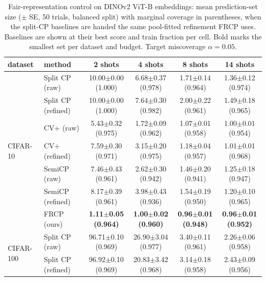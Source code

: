 \begin{table}[t]
\centering
\small
\setlength{\tabcolsep}{4pt}
\caption{Fair-representation control on DINOv2 ViT-B embeddings: mean prediction-set size ($\pm$ SE, 50 trials, balanced split) with marginal coverage in parentheses, when the split-CP baselines are handed the same pool-fitted refinement FRCP uses. Baselines are shown at their best score and train fraction per cell. Bold marks the smallest set per dataset and budget. Target miscoverage $\alpha=0.05$.}
\label{tab:refined-baselines-dinov2-a005}
\begin{tabular}{llcccc}
\toprule
dataset & method & 2 shots & 4 shots & 8 shots & 14 shots\\
\midrule
\multirow{7}{*}{CIFAR-10} & Split CP (raw) & 10.00$\pm$0.00 {\scriptsize(1.000)} & 6.68$\pm$0.37 {\scriptsize(0.978)} & 1.71$\pm$0.14 {\scriptsize(0.964)} & 1.36$\pm$0.12 {\scriptsize(0.974)}\\
 & Split CP (refined) & 10.00$\pm$0.00 {\scriptsize(1.000)} & 7.64$\pm$0.30 {\scriptsize(0.982)} & 2.00$\pm$0.22 {\scriptsize(0.961)} & 1.49$\pm$0.18 {\scriptsize(0.965)}\\
 & CV+ (raw) & 5.43$\pm$0.32 {\scriptsize(0.975)} & 1.72$\pm$0.09 {\scriptsize(0.962)} & 1.07$\pm$0.01 {\scriptsize(0.958)} & 1.00$\pm$0.01 {\scriptsize(0.954)}\\
 & CV+ (refined) & 7.59$\pm$0.30 {\scriptsize(0.971)} & 3.15$\pm$0.20 {\scriptsize(0.975)} & 1.18$\pm$0.04 {\scriptsize(0.957)} & 1.01$\pm$0.01 {\scriptsize(0.968)}\\
 & SemiCP (raw) & 7.46$\pm$0.43 {\scriptsize(0.961)} & 2.62$\pm$0.30 {\scriptsize(0.942)} & 1.46$\pm$0.20 {\scriptsize(0.941)} & 1.25$\pm$0.18 {\scriptsize(0.947)}\\
 & SemiCP (refined) & 8.17$\pm$0.39 {\scriptsize(0.961)} & 3.98$\pm$0.43 {\scriptsize(0.936)} & 1.54$\pm$0.19 {\scriptsize(0.950)} & 1.20$\pm$0.10 {\scriptsize(0.965)}\\
 & FRCP (ours) & \textbf{1.11$\pm$0.05 {\scriptsize(0.964)}} & \textbf{1.00$\pm$0.02 {\scriptsize(0.960)}} & \textbf{0.96$\pm$0.01 {\scriptsize(0.948)}} & \textbf{0.96$\pm$0.01 {\scriptsize(0.952)}}\\
\midrule
\multirow{7}{*}{CIFAR-100} & Split CP (raw) & 96.71$\pm$0.10 {\scriptsize(0.969)} & 26.90$\pm$3.04 {\scriptsize(0.977)} & 3.40$\pm$0.11 {\scriptsize(0.961)} & 2.26$\pm$0.06 {\scriptsize(0.958)}\\
 & Split CP (refined) & 96.92$\pm$0.10 {\scriptsize(0.969)} & 20.83$\pm$3.42 {\scriptsize(0.968)} & 3.14$\pm$0.18 {\scriptsize(0.958)} & 2.43$\pm$0.09 {\scriptsize(0.956)}\\

\end{tabular}
\end{table}
